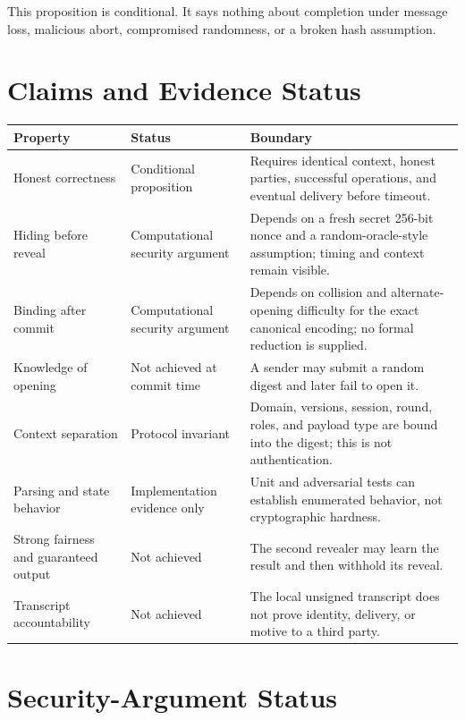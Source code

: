 This proposition is conditional. It says nothing about completion under
message loss, malicious abort, compromised randomness, or a broken hash
assumption.

\section{Claims and Evidence Status}

\begin{center}
\small
\begin{tabular}{|>{\raggedright\arraybackslash}p{}|
                  >{\raggedright\arraybackslash}p{}|
                  >{\raggedright\arraybackslash}p{}|}
\hline
Property & Status & Boundary \\
\hline
Honest correctness & Conditional proposition & Requires identical context, honest parties, successful operations, and eventual delivery before timeout. \\
\hline
Hiding before reveal & Computational security argument & Depends on a fresh secret 256-bit nonce and a random-oracle-style assumption; timing and context remain visible. \\
\hline
Binding after commit & Computational security argument & Depends on collision and alternate-opening difficulty for the exact canonical encoding; no formal reduction is supplied. \\
\hline
Knowledge of opening & Not achieved at commit time & A sender may submit a random digest and later fail to open it. \\
\hline
Context separation & Protocol invariant & Domain, versions, session, round, roles, and payload type are bound into the digest; this is not authentication. \\
\hline
Parsing and state behavior & Implementation evidence only & Unit and adversarial tests can establish enumerated behavior, not cryptographic hardness. \\
\hline
Strong fairness and guaranteed output & Not achieved & The second revealer may learn the result and then withhold its reveal. \\
\hline
Transcript accountability & Not achieved & The local unsigned transcript does not prove identity, delivery, or motive to a third party. \\
\hline
\end{tabular}
\end{center}

\section{Security-Argument Status}

